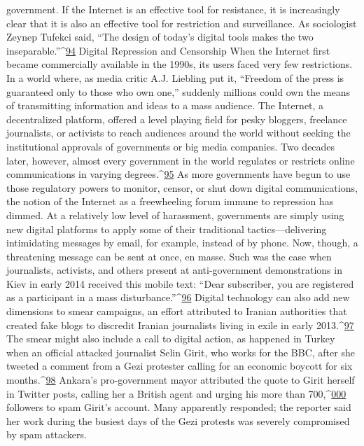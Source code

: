 government.
If the Internet is an effective tool for resistance, it is increasingly clear that it is also an
effective tool for restriction and surveillance. As sociologist Zeynep Tufekci said, ``The
design of today’s digital tools makes the two inseparable.''^{\href{#endnotes}{94}}
Digital Repression and Censorship
When the Internet first became commercially available in the 1990s, its users faced very
few restrictions. In a world where, as media critic A.J. Liebling put it, ``Freedom of the
press is guaranteed only to those who own one,'' suddenly millions could own the means
of transmitting information and ideas to a mass audience. The Internet, a decentralized
platform, offered a level playing field for pesky bloggers, freelance journalists, or
activists to reach audiences around the world without seeking the institutional approvals
of governments or big media companies.
Two decades later, however, almost every government in the world regulates or restricts
online communications in varying degrees.^{\href{#endnotes}{95}} As more governments have begun to use
those regulatory powers to monitor, censor, or shut down digital communications, the
notion of the Internet as a freewheeling forum immune to repression has dimmed.
At a relatively low level of harassment, governments are simply using new digital
platforms to apply some of their traditional tactics—delivering intimidating messages by
email, for example, instead of by phone. Now, though, a threatening message can be sent
at once, en masse. Such was the case when journalists, activists, and others present at
anti-government demonstrations in Kiev in early 2014 received this mobile text: ``Dear
subscriber, you are registered as a participant in a mass disturbance.''^{\href{#endnotes}{96}}
Digital technology can also add new dimensions to smear campaigns, an effort attributed
to Iranian authorities that created fake blogs to discredit Iranian journalists living in exile
in early 2013.^{\href{#endnotes}{97}} The smear might also include a call to digital action, as happened in
Turkey when an official attacked journalist Selin Girit, who works for the BBC, after she
tweeted a comment from a Gezi protester calling for an economic boycott for six
months.^{\href{#endnotes}{98}} Ankara’s pro-government mayor attributed the quote to Girit herself in Twitter
posts, calling her a British agent and urging his more than 700,^{\href{#endnotes}{000}} followers to spam
Girit’s account. Many apparently responded; the reporter said her work during the busiest
days of the Gezi protests was severely compromised by spam attackers.
